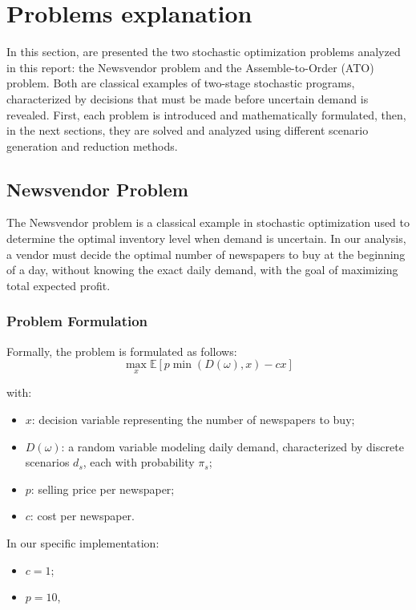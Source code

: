 \documentclass[a4paper,12pt]{article}
\begin{document}
	\newpage
	\section{Problems explanation}
	
	In this section, are presented the two stochastic optimization problems analyzed in this report: the Newsvendor problem and the Assemble-to-Order (ATO) problem. Both are classical examples of two-stage stochastic programs, characterized by decisions that must be made before uncertain demand is revealed. First, each problem is introduced and mathematically formulated, then,  in the next sections, they are solved and analyzed using different scenario generation and reduction methods.
	
	\subsection{Newsvendor Problem}
	
	The Newsvendor problem is a classical example in stochastic optimization used to determine the optimal inventory level when demand is uncertain. In our analysis, a vendor must decide the optimal number of newspapers to buy at the beginning of a day, without knowing the exact daily demand, with the goal of maximizing total expected profit.
	
	\subsubsection{Problem Formulation}
	
	Formally, the problem is formulated as follows:
	\[
	\max_{x} \mathbb{E}[p\min(D(\omega), x) - cx]
	\]
	
	with:
	\begin{itemize}
		\item \( x \): decision variable representing the number of newspapers to buy;
		\item \( D(\omega) \): a random variable modeling daily demand, characterized by discrete scenarios \( d_s \), each with probability \( \pi_s \);
		\item \( p \): selling price per newspaper;
		\item \( c \): cost per newspaper.
	\end{itemize}
	\vspace{0.20cm}
	
	In our specific implementation:
	
	\begin{itemize}
		\item \( c = 1 \);
		\item \( p = 10 \),
	\end{itemize}
	
\end{document}
